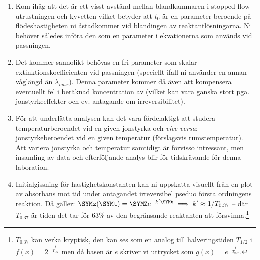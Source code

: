 \begin{enumerate}
\item Kom ihåg att det är ett visst
  avstånd mellan blandkammaren i stopped-flow-utrustningen och
  kyvetten vilket betyder att $t_0$ är en parameter beroende på
  flödeshastigheten ni åstadkommer vid blandingen av
  reaktantlösningarna. Ni behöver således införa den som en parameter i
  ekvationerna som används vid passningen.
\item Det kommer sannolikt behövas en fri parameter som skalar
  extinktionskoefficienten vid passningen (speciellt ifall ni använder en
  annan våglängd än $\lambda_{max}$). Denna parameter kommer då även att
  kompensera eventuellt fel i beräknad koncentration av 
  (vilket kan vara ganska stort pga. jonstyrkeeffekter och ev. antagande
  om irreversibilitet).
\item För att underlätta analysen kan det vara fördelaktigt att studera
  temperaturberoendet vid en given jonstyrka och {\em vice versa}:
  jonstyrkeberoendet vid en given temperatur (förslagsvis
  rumstemperatur). Att variera jonstyrka och temperatur samtidigt är
  förvisso intressant, men insamling av data och efterföljande analys
  blir för tidskrävande för denna laboration.
\item Initialgissning för hastighetskonstanten kan ni uppskatta visuellt
  från en plot av absorbans mot tid under antagandet irreversibel pseduo
  första ordningens reaktion. Då gäller: $\SYMz(\SYMt) = \SYMZ e^{-k' \SYMt} \implies k'
  \approx 1/T_{0.37}$ -- där $T_{0.37}$ är tiden det tar för 63\% av den
  begränsande reaktanten att försvinna.\footnote{$T_{0.37}$ kan verka
    kryptisk, den kan ses som en analog till halveringstiden $T_{1/2}$ i
  $f(x)=2^{-\frac{t}{T_{1/2}}}$ men då basen är $e$ skriver vi uttrycket som $g(x)=e^{-\frac{t}{T_{0.37}}}$.}



\end{enumerate}

